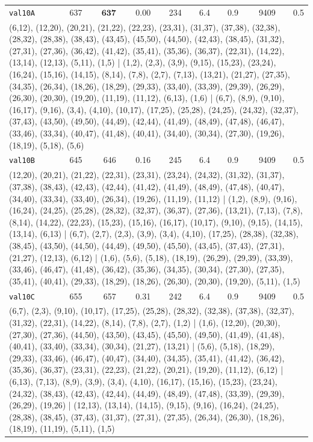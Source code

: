 \begin{landscape}
\begin{longtable}{lrrrrrrrr}
\texttt{val10A} & 637 & $\mathbf{637}$ & 0.00 & 234 & 6.4 & 0.9 & 9409 & 0.5 \\
\multicolumn{9}{p{0.96\linewidth}}{\tiny\raggedright\arraybackslash (6,12), (12,20), (20,21), (21,22), (22,23), (23,31), (31,37), (37,38), (32,38), (28,32), (28,38), (38,43), (43,45), (45,50), (44,50), (42,43), (38,45), (31,32), (27,31), (27,36), (36,42), (41,42), (35,41), (35,36), (36,37), (22,31), (14,22), (13,14), (12,13), (5,11), (1,5) | (1,2), (2,3), (3,9), (9,15), (15,23), (23,24), (16,24), (15,16), (14,15), (8,14), (7,8), (2,7), (7,13), (13,21), (21,27), (27,35), (34,35), (26,34), (18,26), (18,29), (29,33), (33,40), (33,39), (29,39), (26,29), (26,30), (20,30), (19,20), (11,19), (11,12), (6,13), (1,6) | (6,7), (8,9), (9,10), (16,17), (9,16), (3,4), (4,10), (10,17), (17,25), (25,28), (24,25), (24,32), (32,37), (37,43), (43,50), (49,50), (44,49), (42,44), (41,49), (48,49), (47,48), (46,47), (33,46), (33,34), (40,47), (41,48), (40,41), (34,40), (30,34), (27,30), (19,26), (18,19), (5,18), (5,6)} \\[2pt]
\texttt{val10B} & 645 & 646 & 0.16 & 245 & 6.4 & 0.9 & 9409 & 0.5 \\
\multicolumn{9}{p{0.96\linewidth}}{\tiny\raggedright\arraybackslash (12,20), (20,21), (21,22), (22,31), (23,31), (23,24), (24,32), (31,32), (31,37), (37,38), (38,43), (42,43), (42,44), (41,42), (41,49), (48,49), (47,48), (40,47), (34,40), (33,34), (33,40), (26,34), (19,26), (11,19), (11,12) | (1,2), (8,9), (9,16), (16,24), (24,25), (25,28), (28,32), (32,37), (36,37), (27,36), (13,21), (7,13), (7,8), (8,14), (14,22), (22,23), (15,23), (15,16), (16,17), (10,17), (9,10), (9,15), (14,15), (13,14), (6,13) | (6,7), (2,7), (2,3), (3,9), (3,4), (4,10), (17,25), (28,38), (32,38), (38,45), (43,50), (44,50), (44,49), (49,50), (45,50), (43,45), (37,43), (27,31), (21,27), (12,13), (6,12) | (1,6), (5,6), (5,18), (18,19), (26,29), (29,39), (33,39), (33,46), (46,47), (41,48), (36,42), (35,36), (34,35), (30,34), (27,30), (27,35), (35,41), (40,41), (29,33), (18,29), (18,26), (26,30), (20,30), (19,20), (5,11), (1,5)} \\[2pt]
\texttt{val10C} & 655 & 657 & 0.31 & 242 & 6.4 & 0.9 & 9409 & 0.5 \\
\multicolumn{9}{p{0.96\linewidth}}{\tiny\raggedright\arraybackslash (6,7), (2,3), (9,10), (10,17), (17,25), (25,28), (28,32), (32,38), (37,38), (32,37), (31,32), (22,31), (14,22), (8,14), (7,8), (2,7), (1,2) | (1,6), (12,20), (20,30), (27,30), (27,36), (44,50), (43,50), (43,45), (45,50), (49,50), (41,49), (41,48), (40,41), (33,40), (33,34), (30,34), (21,27), (13,21) | (5,6), (5,18), (18,29), (29,33), (33,46), (46,47), (40,47), (34,40), (34,35), (35,41), (41,42), (36,42), (35,36), (36,37), (23,31), (22,23), (21,22), (20,21), (19,20), (11,12), (6,12) | (6,13), (7,13), (8,9), (3,9), (3,4), (4,10), (16,17), (15,16), (15,23), (23,24), (24,32), (38,43), (42,43), (42,44), (44,49), (48,49), (47,48), (33,39), (29,39), (26,29), (19,26) | (12,13), (13,14), (14,15), (9,15), (9,16), (16,24), (24,25), (28,38), (38,45), (37,43), (31,37), (27,31), (27,35), (26,34), (26,30), (18,26), (18,19), (11,19), (5,11), (1,5)} \\[2pt]

\end{longtable}
\end{landscape}
